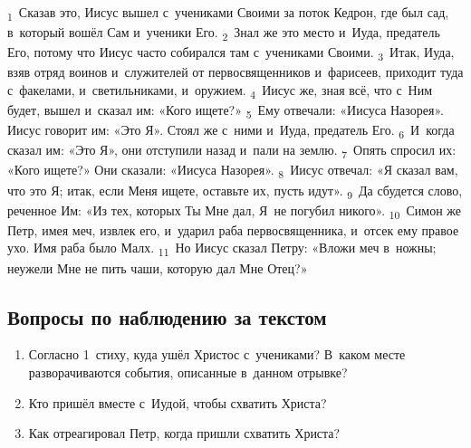 \documentclass[a4paper,12pt]{article}
\begin{document}
\textsubscript{1}~Сказав это, Иисус вышел с~учениками Своими за поток Кедрон, где был сад, в~который вошёл Сам и~ученики Его.
\textsubscript{2}~Знал же это место и~Иуда, предатель Его, потому что Иисус часто собирался там с~учениками Своими.
\textsubscript{3}~Итак, Иуда, взяв отряд воинов и~служителей от первосвященников и~фарисеев, приходит туда с~факелами, и~светильниками, и~оружием.
\textsubscript{4}~Иисус же, зная всё, что с~Ним будет, вышел и~сказал им: «Кого ищете?»
\textsubscript{5}~Ему отвечали: «Иисуса Назорея». Иисус говорит им: «Это Я». Стоял же с~ними и~Иуда, предатель Его.
\textsubscript{6}~И~когда сказал им: «Это Я», они отступили назад и~пали на землю.
\textsubscript{7}~Опять спросил их: «Кого ищете?» Они сказали: «Иисуса Назорея».
\textsubscript{8}~Иисус отвечал: «Я сказал вам, что это Я; итак, если Меня ищете, оставьте их, пусть идут».
\textsubscript{9}~Да сбудется слово, реченное Им: «Из тех, которых Ты Мне дал, Я~не погубил никого».
\textsubscript{10}~Симон же Петр, имея меч, извлек его, и~ударил раба первосвященника, и~отсек ему правое ухо. Имя раба было Малх.
\textsubscript{11}~Но Иисус сказал Петру: «Вложи меч в~ножны; неужели Мне не пить чаши, которую дал Мне Отец?» 

\subsection*{Вопросы по наблюдению за текстом}
\begin{enumerate}
    \item Согласно 1~стиху, куда ушёл Христос с~учениками? В~каком месте разворачиваются события, описанные в~данном отрывке? 
    
    \myline
    
    \myline
    \item Кто пришёл вместе с~Иудой, чтобы схватить Христа? 
    
    \myline
    
    \myline
    \item Как отреагировал Петр, когда пришли схватить Христа? 
    
    \myline
    
    \myline
\end{enumerate}
\end{document}
